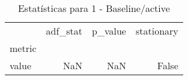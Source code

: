 \begin{table}[htbp]
\caption{Estatísticas para 1 - Baseline/active}
\label{tab:1_-_baseline_active_adf_test}
\begin{tabular}{lrrr}
\toprule
 & adf_stat & p_value & stationary \\
metric &  &  &  \\
\midrule
value & NaN & NaN & False \\
\bottomrule
\end{tabular}
\end{table}
